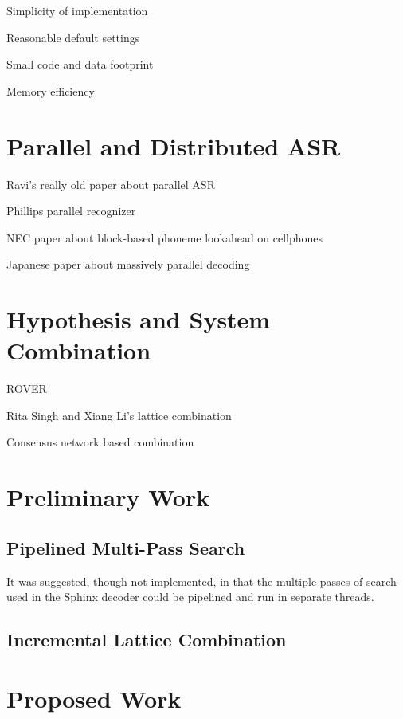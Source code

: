 \documentclass{article}
\begin{document}
Simplicity of implementation

Reasonable default settings

Small code and data footprint

Memory efficiency


\section{Parallel and Distributed ASR}
\label{sec:pdasr}

Ravi's really old paper about parallel ASR \cite{mosur1993}

Phillips parallel recognizer \cite{phillips1999}

NEC paper about block-based phoneme lookahead on cellphones \cite{ishikawa2006}

Japanese paper about massively parallel decoding \cite{shinozaki2004}

\section{Hypothesis and System Combination}
\label{sec:hypcomb}

ROVER \cite{fiscus1997}

Rita Singh and Xiang Li's lattice combination \cite{li2002}

Consensus network based combination \cite{mangu2000}

\section{Preliminary Work}
\label{sec:prelim}

\subsection{Pipelined Multi-Pass Search}
\label{sec:pipeline}

It was suggested, though not implemented, in \cite{mosur1996} that the
multiple passes of search used in the Sphinx decoder could be
pipelined and run in separate threads.

\subsection{Incremental Lattice Combination}
\label{sec:incrlat}


\section{Proposed Work}
\label{sec:proposed}
\end{document}
